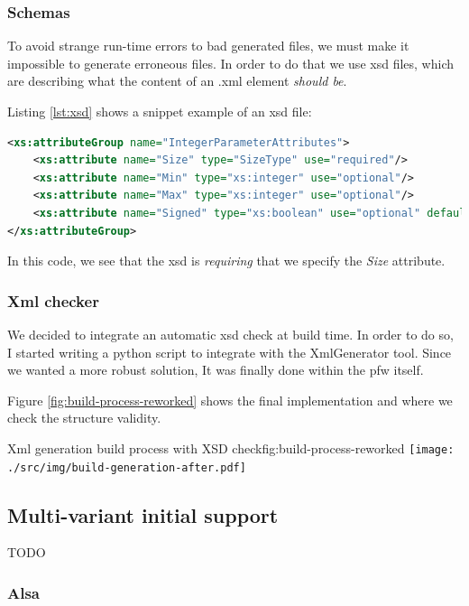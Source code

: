 \subsubsection{Schemas}
To avoid strange run-time errors to bad generated files, we must make it impossible to generate erroneous files.
In order to do that we use \gls{xsd} files, which are describing what the content of an .xml element \emph{should be}.

Listing \ref{lst:xsd} shows a snippet example of an \gls{xsd} file:

\begin{lstlisting}[language=XML, caption=XSD rules for an Integer parameter, label=lst:xsd]
<xs:attributeGroup name="IntegerParameterAttributes">
    <xs:attribute name="Size" type="SizeType" use="required"/>
    <xs:attribute name="Min" type="xs:integer" use="optional"/>
    <xs:attribute name="Max" type="xs:integer" use="optional"/>
    <xs:attribute name="Signed" type="xs:boolean" use="optional" default="false"/>
</xs:attributeGroup>
\end{lstlisting}

In this code, we see that the \gls{xsd} is \emph{requiring} that we specify the \emph{Size} attribute.

\subsubsection{Xml checker}
We decided to integrate an automatic \gls{xsd} check at build time. In order to do so, I started writing a \gls{python} script
to integrate with the XmlGenerator tool. Since we wanted a more robust solution, It was finally done within the \gls{pfw} itself.

Figure \ref{fig:build-process-reworked} shows the final implementation and where we check the structure validity.

\begin{figureGraphics}{Xml generation build process with XSD check}{fig:build-process-reworked}
    \texttt{[image: ./src/img/build-generation-after.pdf]}
\end{figureGraphics}


\subsection{Multi-variant initial support}
TODO

\subsubsection{Alsa}

